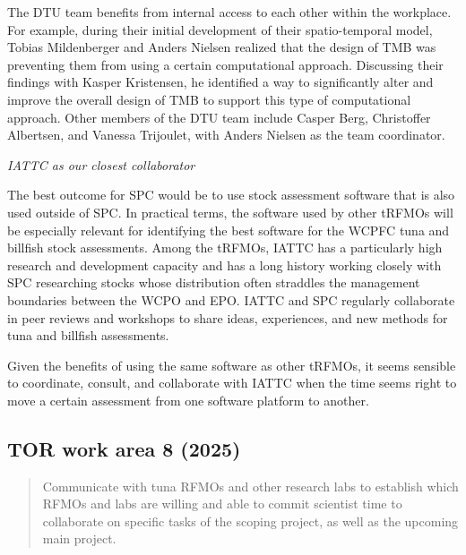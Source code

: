 \documentclass{SCreport}
\begin{document}
\newpage

The DTU team benefits from internal access to each other within the workplace.
For example, during their initial development of their spatio-temporal model,
Tobias Mildenberger and Anders Nielsen realized that the design of TMB was
preventing them from using a certain computational approach. Discussing their
findings with Kasper Kristensen, he identified a way to significantly alter and
improve the overall design of TMB to support this type of computational
approach. Other members of the DTU team include Casper Berg, Christoffer
Albertsen, and Vanessa Trijoulet, with Anders Nielsen as the team coordinator.

\vspace{2ex}

\textit{IATTC as our closest collaborator}

The best outcome for SPC would be to use stock assessment software that is also
used outside of SPC. In practical terms, the software used by other tRFMOs will
be especially relevant for identifying the best software for the WCPFC tuna and
billfish stock assessments. Among the tRFMOs, IATTC has a particularly high
research and development capacity and has a long history working closely with
SPC researching stocks whose distribution often straddles the management
boundaries between the WCPO and EPO. IATTC and SPC regularly collaborate in peer
reviews and workshops to share ideas, experiences, and new methods for tuna and
billfish assessments.

Given the benefits of using the same software as other tRFMOs, it seems sensible
to coordinate, consult, and collaborate with IATTC when the time seems right to
move a certain assessment from one software platform to another.

\newpage

\subsection{TOR work area 8 (2025)}

\begin{quote}\sf
  Communicate with tuna RFMOs and other research labs to establish which RFMOs
  and labs are willing and able to commit scientist time to collaborate on
  specific tasks of the scoping project, as well as the upcoming main project.
\end{quote}

\vspace{2ex}
\end{document}
